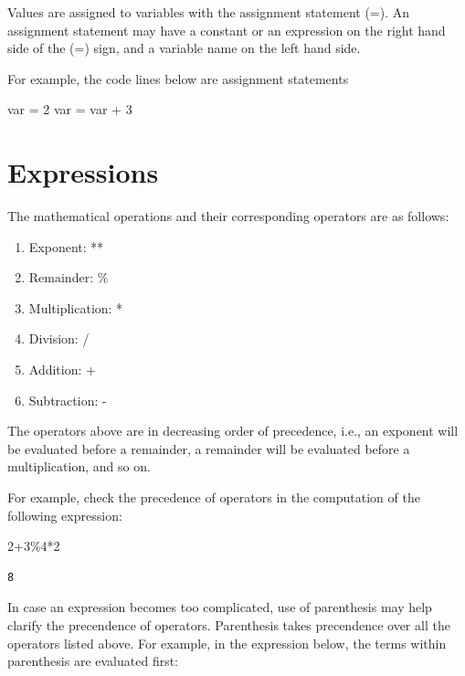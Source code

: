 \documentclass[
  letterpaper,
  DIV=11,
  numbers=noendperiod]{scrreprt}
\newenvironment{Shaded}{\begin{snugshade}}{\end{snugshade}}
\newcommand{\DecValTok}[1]{\textcolor[rgb]{0.68,0.00,0.00}{#1}}
\newcommand{\NormalTok}[1]{\textcolor[rgb]{0.00,0.23,0.31}{#1}}
\newcommand{\OperatorTok}[1]{\textcolor[rgb]{0.37,0.37,0.37}{#1}}
\begin{document}
Values are assigned to variables with the assignment statement (=). An
assignment statement may have a constant or an expression on the right
hand side of the (=) sign, and a variable name on the left hand side.

For example, the code lines below are assignment statements

\begin{Shaded}
\begin{Highlighting}[]
\NormalTok{var }\OperatorTok{=} \DecValTok{2}
\NormalTok{var }\OperatorTok{=}\NormalTok{ var }\OperatorTok{+} \DecValTok{3}
\end{Highlighting}
\end{Shaded}

\hypertarget{expressions}{%
\section{Expressions}\label{expressions}}

The mathematical operations and their corresponding operators are as
follows:

\begin{enumerate}
\def\labelenumi{\arabic{enumi}.}
\item
  Exponent: **
\item
  Remainder: \%
\item
  Multiplication: *
\item
  Division: /
\item
  Addition: +
\item
  Subtraction: -
\end{enumerate}

The operators above are in decreasing order of precedence, i.e., an
exponent will be evaluated before a remainder, a remainder will be
evaluated before a multiplication, and so on.

For example, check the precedence of operators in the computation of the
following expression:

\begin{Shaded}
\begin{Highlighting}[]
\DecValTok{2}\OperatorTok{+}\DecValTok{3}\OperatorTok{\%}\DecValTok{4}\OperatorTok{*}\DecValTok{2}
\end{Highlighting}
\end{Shaded}

\begin{verbatim}
8
\end{verbatim}

In case an expression becomes too complicated, use of parenthesis may
help clarify the precendence of operators. Parenthesis takes precendence
over all the operators listed above. For example, in the expression
below, the terms within parenthesis are evaluated first:
\end{document}
